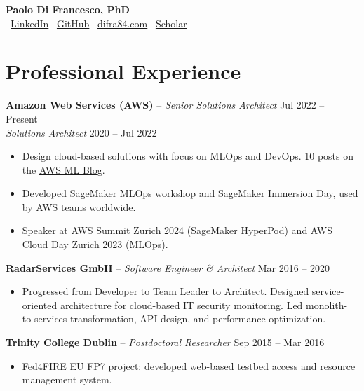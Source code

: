 \documentclass[10pt,a4paper]{article}
\begin{document}
\begin{center}
{\Large\bfseries Paolo Di Francesco, PhD}\\[2pt]
{\small
\faLinkedin\ \href{https://www.linkedin.com/in/paolo-di-francesco}{LinkedIn} \quad
\faGithub\ \href{https://github.com/pdifranc}{GitHub} \quad
\faGlobe\ \href{https://difra84.com}{difra84.com} \quad
\faGraduationCap\ \href{https://scholar.google.at/citations?user=ZpEaqsQAAAAJ}{Scholar}
}
\end{center}

\vspace{-4pt}
\section{Professional Experience}

\textbf{Amazon Web Services (AWS)} -- \textit{Senior Solutions Architect} \hfill Jul 2022 -- Present\\
\textit{Solutions Architect} \hfill 2020 -- Jul 2022
\vspace{-4pt}
\begin{itemize}[nosep,leftmargin=*,topsep=2pt]
\item Design cloud-based solutions with focus on MLOps and DevOps. 10 posts on the \href{https://aws.amazon.com/blogs/machine-learning/author/frpaolo/}{AWS ML Blog}.
\item Developed \href{https://catalog.workshops.aws/mlops-from-idea-to-production}{SageMaker MLOps workshop} and \href{https://sagemaker-immersionday.workshop.aws/}{SageMaker Immersion Day}, used by AWS teams worldwide.
\item Speaker at AWS Summit Zurich 2024 (SageMaker HyperPod) and AWS Cloud Day Zurich 2023 (MLOps).
\end{itemize}

\textbf{RadarServices GmbH} -- \textit{Software Engineer \& Architect} \hfill Mar 2016 -- 2020\\
\vspace{-4pt}
\begin{itemize}[nosep,leftmargin=*,topsep=2pt]
\item Progressed from Developer to Team Leader to Architect. Designed service-oriented architecture for cloud-based IT security monitoring. Led monolith-to-services transformation, API design, and performance optimization.
\end{itemize}

\textbf{Trinity College Dublin} -- \textit{Postdoctoral Researcher} \hfill Sep 2015 -- Mar 2016\\
\vspace{-4pt}
\begin{itemize}[nosep,leftmargin=*,topsep=2pt]
\item \href{https://www.fed4fire.eu/}{Fed4FIRE} EU FP7 project: developed web-based testbed access and resource management system.
\end{itemize}
\end{document}
